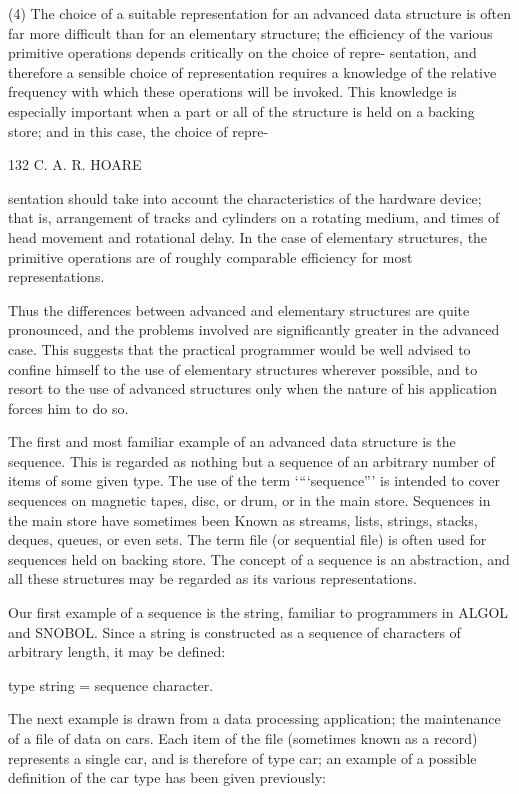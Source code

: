 {{{{				(4) The choice of a suitable representation for an advanced data structure is often far more difficult than for an elementary structure; the efficiency of the various primitive operations depends critically on the choice of repre- sentation, and therefore a sensible choice of representation requires a knowledge of the relative frequency with which these operations will be invoked. This knowledge is especially important when a part or all of the structure is held on a backing store; and in this case, the choice of repre-
				
				132 C. A. R. HOARE
				
				sentation should take into account the characteristics of the hardware device; that is, arrangement of tracks and cylinders on a rotating medium, and times of head movement and rotational delay. In the case of elementary structures, the primitive operations are of roughly comparable efficiency for most representations.
				
				Thus the differences between advanced and elementary structures are quite pronounced, and the problems involved are significantly greater in the advanced case. This suggests that the practical programmer would be well advised to confine himself to the use of elementary structures wherever possible, and to resort to the use of advanced structures only when the nature of his application forces him to do so.
				
				The first and most familiar example of an advanced data structure is the sequence. This is regarded as nothing but a sequence of an arbitrary number of items of some given type. The use of the term ‘“‘sequence”’ is intended to cover sequences on magnetic tapes, disc, or drum, or in the main store. Sequences in the main store have sometimes been Known as streams, lists, strings, stacks, deques, queues, or even sets. The term file (or sequential file) is often used for sequences held on backing store. The concept of a sequence is an abstraction, and all these structures may be regarded as its various representations.
				
				Our first example of a sequence is the string, familiar to programmers in ALGOL and SNOBOL. Since a string is constructed as a sequence of characters of arbitrary length, it may be defined:
				
				type string = sequence character.
				
				The next example is drawn from a data processing application; the maintenance of a file of data on cars. Each item of the file (sometimes known as a record) represents a single car, and is therefore of type car; an example of a possible definition of the car type has been given previously:
				
}}}}
